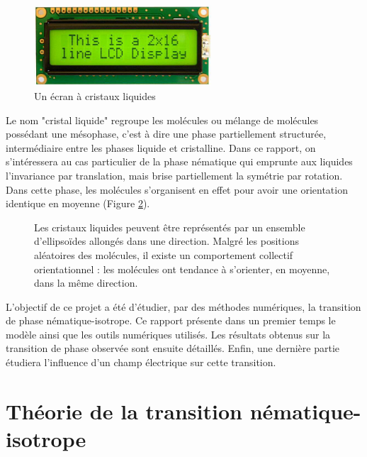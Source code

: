 \documentclass[11pt,a4paper]{article}
\numberwithin{equation}{section}
\begin{document}
\begin{figure}[h]
    \centering	    
	\includegraphics[height=3cm]{figures/lcd.jpg}
    \caption{Un écran à cristaux liquides}
    	\label{lcd} 
\end{figure}

Le nom "cristal liquide" regroupe les molécules ou mélange de molécules possédant une mésophase, c'est à dire une phase partiellement structurée, intermédiaire entre les phases liquide et cristalline. Dans ce rapport, on s'intéressera au cas particulier de la phase nématique qui emprunte aux liquides l'invariance par translation, mais brise partiellement la symétrie par rotation. Dans cette phase, les molécules s'organisent en effet pour avoir une orientation identique en moyenne (Figure \ref{nematic_phase}).

\begin{figure}[h]
    \center
    
    \caption{Les cristaux liquides peuvent être représentés par un ensemble d'ellipsoïdes allongés dans une direction.
    Malgré les positions aléatoires des molécules, il existe un comportement collectif orientationnel : les molécules ont tendance à s'orienter, en moyenne, dans la même direction. }
    \label{nematic_phase}
\end{figure}

L'objectif de ce projet a été d'étudier, par des méthodes numériques, la transition de phase nématique-isotrope. Ce rapport présente dans un premier temps le modèle ainsi que les outils numériques utilisés. Les résultats obtenus sur la transition de phase observée sont ensuite détaillés. Enfin, une dernière partie étudiera l'influence d'un champ électrique sur cette transition.

\newpage
\section{Théorie de la transition nématique-isotrope}
\end{document}
